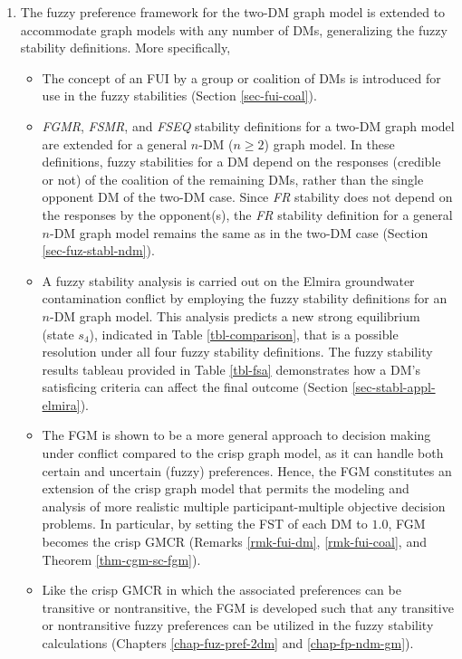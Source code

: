 \begin{enumerate}
\item The fuzzy preference framework for the two-DM graph model is extended to accommodate graph models with any number of DMs, generalizing the fuzzy stability definitions. More specifically,
  \begin{itemize}
    \item The concept of an FUI by a group or coalition of DMs is introduced for use in the fuzzy stabilities (Section \ref{sec-fui-coal}).
    \item  \emph{FGMR}, \emph{FSMR}, and \emph{FSEQ} stability definitions for a two-DM graph model are extended for a general $n$-DM ($n\geq 2$) graph model. In these definitions, fuzzy stabilities for a DM depend on the responses (credible or not) of the coalition of the remaining DMs, rather than the single opponent DM of the two-DM case. Since \emph{FR} stability does not depend on the responses by the opponent(s), the \emph{FR} stability definition for a general $n$-DM graph model remains the same as in the two-DM case (Section \ref{sec-fuz-stabl-ndm}).
    \item A fuzzy stability analysis is carried out on the Elmira groundwater contamination conflict by employing the fuzzy stability definitions for an $n$-DM graph model. This analysis predicts a new strong equilibrium (state $s_4$), indicated in Table \ref{tbl-comparison}, that is a possible resolution under all four fuzzy stability definitions. The fuzzy stability results tableau provided in Table \ref{tbl-fsa} demonstrates how a DM's satisficing criteria can affect the final outcome (Section \ref{sec-stabl-appl-elmira}).
    \item The FGM is shown to be a more general approach to decision making under conflict compared to the crisp graph model, as it can handle both certain and uncertain (fuzzy) preferences. Hence, the FGM constitutes an extension of the crisp graph model that permits the modeling and analysis of more realistic multiple participant-multiple objective decision problems. In particular, by setting the FST of each DM to $1.0$, FGM becomes the crisp GMCR (Remarks \ref{rmk-fui-dm}, \ref{rmk-fui-coal}, and Theorem \ref{thm-cgm-sc-fgm}).
    \item Like the crisp GMCR in which the associated preferences can be transitive or nontransitive, the FGM is developed such that any transitive or nontransitive fuzzy preferences can be utilized in the fuzzy stability calculations (Chapters \ref{chap-fuz-pref-2dm} and \ref{chap-fp-ndm-gm}).
  \end{itemize}


\end{enumerate}
